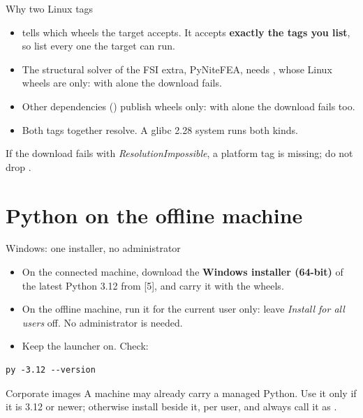 \documentclass[aspectratio=169,11pt]{beamer}
\begin{document}
\begin{frame}{Why two Linux tags}
\begin{itemize}\small
  \item {} tells  which wheels the target accepts. It
        accepts \textbf{exactly the tags you list}, so list every one the
        target can run.
  \item The structural solver of the FSI extra, PyNiteFEA, needs
        , whose Linux wheels are 
        only: with  alone the download fails.
  \item Other dependencies () publish 
        wheels only: with  alone the download fails
        too.
  \item Both tags together resolve. A glibc 2.28 system runs both kinds.
\end{itemize}
\begin{takeaway}If the download fails with \emph{ResolutionImpossible}, a
platform tag is missing; do not drop .\end{takeaway}
\end{frame}

\section{Python on the offline machine}

\begin{frame}[fragile]{Windows: one installer, no administrator}
\begin{itemize}\small
  \item On the connected machine, download the \textbf{Windows installer
        (64-bit)} of the latest Python 3.12 from  [5], and
        carry it with the wheels.
  \item On the offline machine, run it for the current user only: leave
        \emph{Install for all users} off. No administrator is needed.
  \item Keep the  launcher on. Check:
\end{itemize}
\begin{lstlisting}[style=ftsbase]
py -3.12 --version
\end{lstlisting}
\begin{alertblock}{Corporate images}
\small A machine may already carry a managed Python. Use it only if it is 3.12
or newer; otherwise install beside it, per user, and always call it as
.
\end{alertblock}
\end{frame}
\end{document}
